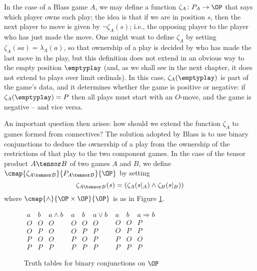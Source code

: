 \documentclass[11pt]{article} %
\begin{document}
In the case of a Blass game $A$, we may define a function $\zeta_A\colon P_A\to\OP$ that says which player owns each play; the idea is that if we are in position $s$, then the next player to move is given by $\neg\zeta_A(s)$; i.e., the opposing player to the player who has just made the move.  One might want to define $\zeta_A$ by setting $\zeta_A(sa)=\lambda_A(a)$, so that ownership of a play is decided by who has made the last move in the play, but this definition does not extend in an obvious way to the empty position $\emptyplay$ (and, as we shall see in the next chapter, it does not extend to plays over limit ordinals).  In this case, $\zeta_A(\emptyplay)$ is part of the game's data, and it determines whether the game is positive or negative: if $\zeta_A(\emptyplay) = P$ then all plays must start with an $O$-move, and the game is negative -- and vice versa.

An important question then arises: how should we extend the function $\zeta_A$ to games formed from connectives?  The solution adopted by Blass is to use binary conjunctions to deduce the ownership of a play from the ownership of the restrictions of that play to the two component games.  In the case of the tensor product $A\tensor B$ of two games $A$ and $B$, we define $\cmap{\zeta_{A\tensor B}}{P_{A\tensor B}}{\OP}$ by setting
\[
  \zeta_{A\tensor B}(s) = (\zeta_A(s\vert_A) \wedge \zeta_B(s\vert_B))
  \]
where $\cmap{\wedge}{\OP\times \OP}{\OP}$ is as in Figure \ref{truthtables}.

\begin{figure}[h]
  \begin{center}
    $\begin{array}{cc|c}
      a & b & a \wedge b \\
      \hline
      O & O & O \\
      O & P & O \\
      P & O & O \\
      P & P & P
    \end{array}$
    \quad
    $\begin{array}{cc|c}
      a & b & a \vee b \\
      \hline
      O & O & O \\
      O & P & P \\
      P & O & P \\
      P & P & P
    \end{array}$
    \quad
    $\begin{array}{cc|c}
      a & b & a \Rightarrow b \\
      \hline
      O & O & P \\
      O & P & P \\
      P & O & O \\
      P & P & P
    \end{array}$
    \caption{Truth tables for binary conjunctions on $\OP$}
    \label{truthtables}
  \end{center}
\end{figure}
\end{document}
